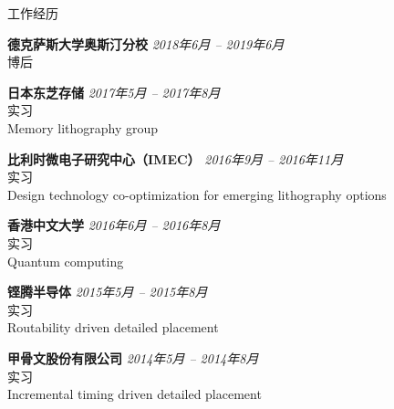 
\begin{rSection}{工作经历}

{\bf 德克萨斯大学奥斯汀分校}                           \hfill {\em 2018年6月 -- 2019年6月} \\
博后

{\bf 日本东芝存储}                           \hfill {\em 2017年5月 -- 2017年8月} \\
实习 \\
Memory lithography group

{\bf 比利时微电子研究中心（IMEC）}                           \hfill {\em 2016年9月 -- 2016年11月} \\
实习 \\
Design technology co-optimization for emerging lithography options

{\bf 香港中文大学}                           \hfill {\em 2016年6月 -- 2016年8月} \\
实习 \\
Quantum computing

{\bf 铿腾半导体}                           \hfill {\em 2015年5月 -- 2015年8月} \\
实习 \\
Routability driven detailed placement

{\bf 甲骨文股份有限公司}                           \hfill {\em 2014年5月 -- 2014年8月} \\
实习 \\
Incremental timing driven detailed placement


\end{rSection}



